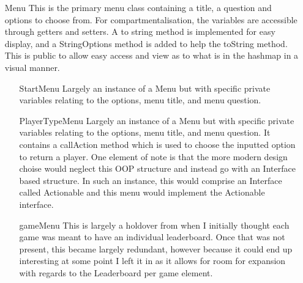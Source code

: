 \documentclass{scrreprt}
\begin{document}
\begin{itemize}
	\item[Menu] This is the primary menu class containing a title, a question and options to choose from. For compartmentalisation, the variables are accessible through getters and setters. A to string method is implemented for easy display, and a StringOptions method is added to help the toString method. This is public to allow easy access and view as to what is in the hashmap in a visual manner.
	
	\begin{itemize}
		\item[StartMenu] Largely an instance of a Menu but with specific private variables relating to the options, menu title, and menu question. 
	\end{itemize}

	\begin{itemize}
		\item[PlayerTypeMenu]  Largely an instance of a Menu but with specific private variables relating to the options, menu title, and menu question. It contains a callAction method which is used to choose the inputted option to return a player. One element of note is that the more modern design choise would neglect this OOP structure and instead go with an Interface based structure. In such an instance, this would comprise an Interface called Actionable and this menu would implement the Actionable interface. 
	\end{itemize}

	\begin{itemize}
	\item[gameMenu] This is largely a holdover from when I initially thought each game was meant to have an individual leaderboard. Once that was not present, this became largely redundant, however because it could end up interesting at some point I left it in as it allows for room for expansion with regards to the Leaderboard per game element.
\end{itemize}

\end{itemize}
\end{document}
